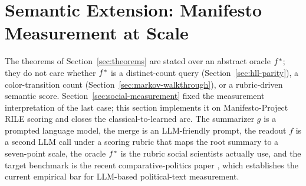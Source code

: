 \section{Semantic Extension: Manifesto Measurement at Scale}\label{sec:manifesto-llm}

The theorems of Section~\ref{sec:theorems} are stated over an abstract oracle $f^\ast$; they do not care whether $f^\ast$ is a distinct-count query (Section~\ref{sec:hll-parity}), a color-transition count (Section~\ref{sec:markov-walkthrough}), or a rubric-driven semantic score. Section~\ref{sec:social-measurement} fixed the measurement interpretation of the last case; this section implements it on Manifesto-Project RILE scoring and closes the classical-to-learned arc. The summarizer $g$ is a prompted language model, the merge is an LLM-friendly prompt, the readout $f$ is a second LLM call under a scoring rubric that maps the root summary to a seven-point scale, the oracle $f^\ast$ is the rubric social scientists actually use, and the target benchmark is the recent comparative-politics paper \citet{BenoitEtAl2025}, which establishes the current empirical bar for LLM-based political-text measurement.


